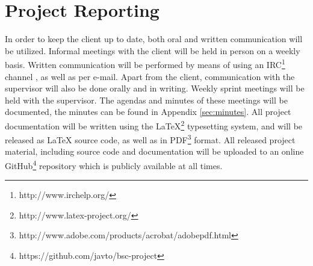 \section{Project Reporting}
In order to keep the client up to date, both oral and written communication will be utilized. Informal meetings with the client will be held in person on a weekly basis. Written communication will be performed by means of using an IRC\footnote{http://www.irchelp.org/} channel , as well as per e-mail. Apart from the client, communication with the supervisor will also be done orally and in writing. Weekly sprint meetings will be held with the supervisor. The agendas and minutes of these meetings will be documented, the minutes can be found in Appendix \ref{sec:minutes}. All project documentation will be written using the LaTeX\footnote{http://www.latex-project.org/} typesetting system, and will be released as LaTeX source code, as well as in PDF\footnote{http://www.adobe.com/products/acrobat/adobepdf.html} format. All released project material, including source code and documentation will be uploaded to an online GitHub\footnote{https://github.com/javto/bsc-project} repository which is publicly available at all times.